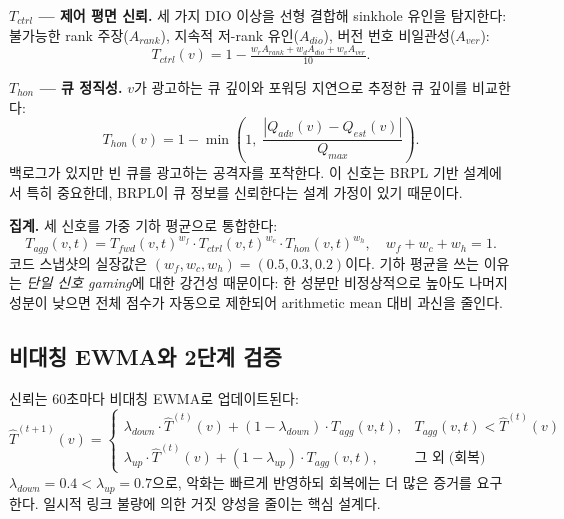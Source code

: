 \documentclass[12pt,a4paper]{article}
\begin{document}
\noindent\textbf{$T_{ctrl}$ — 제어 평면 신뢰.}
세 가지 DIO 이상을 선형 결합해 sinkhole 유인을 탐지한다:
불가능한 rank 주장($A_{rank}$),
지속적 저-rank 유인($A_{dio}$),
버전 번호 비일관성($A_{ver}$):
\begin{equation}
  T_{ctrl}(v)=1-\tfrac{w_r A_{rank}+w_d A_{dio}+w_v A_{ver}}{10}.
\end{equation}

\noindent\textbf{$T_{hon}$ — 큐 정직성.}
$v$가 광고하는 큐 깊이와 포워딩 지연으로 추정한 큐 깊이를 비교한다:
\begin{equation}
  T_{hon}(v)=1-\min\!\left(1,\;
    \frac{|Q_{adv}(v)-Q_{est}(v)|}{Q_{max}}\right).
\end{equation}
백로그가 있지만 빈 큐를 광고하는 공격자를 포착한다.
이 신호는 BRPL 기반 설계에서 특히 중요한데,
BRPL이 큐 정보를 신뢰한다는 설계 가정이 있기 때문이다.

\noindent\textbf{집계.} 세 신호를 가중 기하 평균으로 통합한다:
\begin{equation}
  T_{agg}(v,t) =
  T_{fwd}(v,t)^{w_f}\cdot
  T_{ctrl}(v,t)^{w_c}\cdot
  T_{hon}(v,t)^{w_h},
  \quad
  w_f+w_c+w_h=1.
  \label{eq:tagg}
\end{equation}
코드 스냅샷의 실장값은 $(w_f,w_c,w_h)=(0.5,0.3,0.2)$이다.
기하 평균을 쓰는 이유는 \textit{단일 신호 gaming}에 대한 강건성 때문이다:
한 성분만 비정상적으로 높아도 나머지 성분이 낮으면 전체 점수가
자동으로 제한되어 arithmetic mean 대비 과신을 줄인다.

\subsection{비대칭 EWMA와 2단계 검증}

신뢰는 60초마다 비대칭 EWMA로 업데이트된다:
\begin{equation}
  \hat{T}^{(t+1)}(v)=
  \begin{cases}
    \lambda_{down}\cdot \hat{T}^{(t)}(v)
      +(1-\lambda_{down})\cdot T_{agg}(v,t),
      &T_{agg}(v,t) < \hat{T}^{(t)}(v)\\
    \lambda_{up}\cdot \hat{T}^{(t)}(v)
      +(1-\lambda_{up})\cdot T_{agg}(v,t),
      &\text{그 외}\;\text{(회복)}
  \end{cases}
  \label{eq:ewma}
\end{equation}
$\lambda_{down} = 0.4 < \lambda_{up} = 0.7$으로,
악화는 빠르게 반영하되 회복에는 더 많은 증거를 요구한다.
일시적 링크 불량에 의한 거짓 양성을 줄이는 핵심 설계다.
\end{document}
